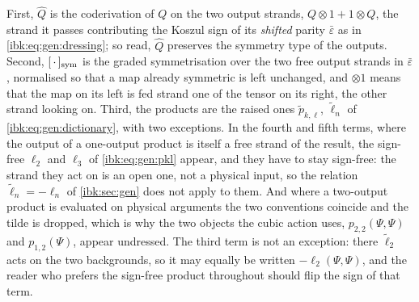 First, $\hat Q$ is the coderivation of $Q$ on the two output strands, $Q\otimes1+1\otimes Q$, the strand it passes contributing the Koszul sign of its \emph{shifted} parity $\bar\varepsilon$ as in \eqref{ibk:eq:gen:dressing}; so read, $\hat Q$ preserves the symmetry type of the outputs. Second, $[\,\cdot\,]_{\rm sym}$ is the graded symmetrisation over the two free output strands in $\bar\varepsilon$, normalised so that a map already symmetric is left unchanged, and $\otimes1$ means that the map on its left is fed strand one of the tensor on its right, the other strand looking on. Third, the products are the raised ones $\tilde p_{k,\ell}$, $\tilde\ell_n$ of \eqref{ibk:eq:gen:dictionary}, with two exceptions. In the fourth and fifth terms, where the output of a one-output product is itself a free strand of the result, the sign-free $\ell_2$ and $\ell_3$ of \eqref{ibk:eq:gen:pkl} appear, and they have to stay sign-free: the strand they act on is an open one, not a physical input, so the relation $\tilde\ell_n=-\ell_n$ of \cref{ibk:sec:gen} does not apply to them. And where a two-output product is evaluated on physical arguments the two conventions coincide and the tilde is dropped, which is why the two objects the cubic action uses, $p_{2,2}(\Psi,\Psi)$ and $p_{1,2}(\Psi)$, appear undressed. The third term is not an exception: there $\tilde\ell_2$ acts on the two backgrounds, so it may equally be written $-\ell_2(\Psi,\Psi)$, and the reader who prefers the sign-free product throughout should flip the sign of that term.

